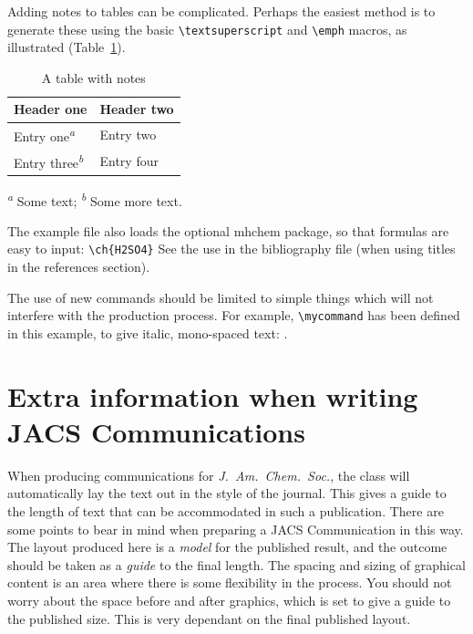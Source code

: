 Adding notes to tables can be complicated.  Perhaps the easiest
method is to generate these using the basic
\texttt{\textbackslash textsuperscript} and
\texttt{\textbackslash emph} macros, as illustrated (Table~\ref{tbl:notes}).
\begin{table}
  \caption{A table with notes}
  \label{tbl:notes}
  \begin{tabular}{ll}
    \hline
    Header one                            & Header two \\
    \hline
    Entry one\textsuperscript{\emph{a}}   & Entry two  \\
    Entry three\textsuperscript{\emph{b}} & Entry four \\
    \hline
  \end{tabular}

  \textsuperscript{\emph{a}} Some text;
  \textsuperscript{\emph{b}} Some more text.
\end{table}

The example file also loads the optional \textsf{mhchem} package, so
that formulas are easy to input: \texttt{\textbackslash ch\{H2SO4\}}
See the use in the bibliography file (when using
titles in the references section).

The use of new commands should be limited to simple things which will
not interfere with the production process.  For example,
\texttt{\textbackslash mycommand} has been defined in this example,
to give italic, mono-spaced text: .

\section{Extra information when writing JACS Communications}

When producing communications for \emph{J.~Am.\ Chem.\ Soc.}, the
class will automatically lay the text out in the style of the
journal. This gives a guide to the length of text that can be
accommodated in such a publication. There are some points to bear in
mind when preparing a JACS Communication in this way.  The layout
produced here is a \emph{model} for the published result, and the
outcome should be taken as a \emph{guide} to the final length. The
spacing and sizing of graphical content is an area where there is
some flexibility in the process.  You should not worry about the
space before and after graphics, which is set to give a guide to the
published size. This is very dependant on the final published layout.

